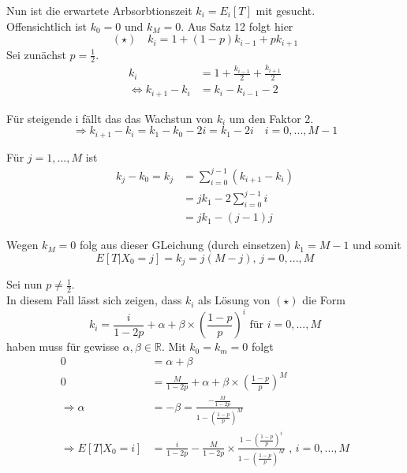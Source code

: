 \documentclass[a4paper,12pt]{article}
\begin{document}
\begin{tcolorbox}[breakable, colframe=blue, colback=white, title=Beispiel 9 (Fortsetzung)]
	Nun ist die erwartete Arbsorbtionszeit $k_i =E_i[T]$ mit gesucht.\\
	Offensichtlich ist $k_0 = 0$ und $k_M = 0$. Aus Satz 12 folgt hier
	$$
		(\star) \quad k_i = 1+ (1-p)k_{i-1} + pk_{i+1}
	$$
	Sei zunächst $p = \frac{1}{2}$.
	\begin{align*}
		k_i                           & = 1 + \frac{k_{i-1}}{2} + \frac{k_{i+1}}{2} \\
		\Leftrightarrow k_{i+1} - k_i & = k_i - k_{i-1} -2
	\end{align*}

	Für steigende i fällt das das Wachstun von $k_i$ um den Faktor 2.
	$$
		\Rightarrow k_{i+1} - k_i= k_1 - k_0 - 2i = k_1 - 2i \quad i = 0, ..., M-1
	$$

	Für $j = 1, ..., M$ ist
	\begin{align*}
		k_j - k_0 = k_j & = \sum_{i=0}^{j-1}(k_{i+1}-k_i) \\
		                & = jk_1 - 2\sum_{i=0}^{j-1}i     \\
		                & = jk_1 - (j-1)j
	\end{align*}

	Wegen $k_M = 0$ folg aus dieser GLeichung (durch einsetzen) $k_1 = M-1$ und somit
	$$
		E[T|X_0 = j] = k_j = j(M-j) \text{, } j= 0,..., M
	$$

	Sei nun $p \neq \frac{1}{2}$.\\
	In diesem Fall lässt sich zeigen, dass $k_i$ als Lösung von $(\star)$ die Form
	$$
		k_i = \frac{i}{1-2p}+ \alpha + \beta \times \left(\frac{1-p}{p}\right)^i \text{ für } i=0,...,M
	$$
	haben muss für gewisse $\alpha, \beta \in \mathbb{R}$.
	Mit $k_0 = k_m = 0$ folgt
	\begin{align*}
		0                        & = \alpha + \beta                                                                                                                            \\
		0                        & = \frac{M}{1-2p} + \alpha + \beta \times \left(\frac{1-p}{p}\right)^M                                                                       \\
		\Rightarrow \alpha       & =- \beta = \frac{-\frac{M}{1-2p}}{1- \left(\frac{1-p}{p}\right)^M}                                                                          \\
		\Rightarrow E[T|X_0 = i] & = \frac{i}{1-2p} - \frac{M}{1-2p} \times \frac{1 - \left(\frac{1-p}{p}\right)^i}{1 - \left(\frac{1-p}{p}\right)^M} \text{ , } i = 0, ..., M
	\end{align*}
\end{tcolorbox}
\end{document}

